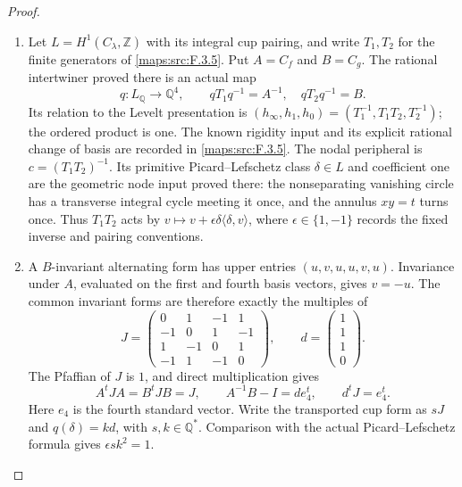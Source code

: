 \begin{proof}
\begin{enumerate}[label=\arabic*.]
\item Let $L=H^1(C_\lambda,\mathbb Z)$ with its integral cup pairing,
and write $T_1,T_2$ for the finite generators of
\cref{maps:src:F.3.5}. Put $A=C_f$ and $B=C_g$.
The rational intertwiner proved there is an actual map
\[
 q:L_{\mathbb Q}\longrightarrow\mathbb Q^4,
 \qquad qT_1q^{-1}=A^{-1},\quad qT_2q^{-1}=B.
\]
Its relation to the Levelt presentation is
$(h_\infty,h_1,h_0)=(T_1^{-1},T_1T_2,T_2^{-1})$;
the ordered product is one. The known rigidity input and its explicit
rational change of basis are recorded in \cref{maps:src:F.3.5}.
The nodal peripheral is $c=(T_1T_2)^{-1}$. Its primitive
Picard--Lefschetz class $\delta\in L$ and coefficient one are the
geometric node input proved there: the nonseparating vanishing circle
has a transverse integral cycle meeting it once, and the annulus
$xy=t$ turns once. Thus $T_1T_2$ acts by
$v\mapsto v+\epsilon\delta\langle\delta,v\rangle$,
where $\epsilon\in\{1,-1\}$ records the fixed inverse and pairing
conventions.

\item A $B$-invariant alternating form has upper entries
$(u,v,u,u,v,u)$. Invariance under $A$, evaluated on the first and
fourth basis vectors, gives $v=-u$. The common invariant forms are
therefore exactly the multiples of
\[
 J=\begin{pmatrix}
 0&1&-1&1\\-1&0&1&-1\\1&-1&0&1\\-1&1&-1&0
 \end{pmatrix},\qquad
 d=\begin{pmatrix}1\\1\\1\\0\end{pmatrix}.
\]
The Pfaffian of $J$ is $1$, and direct multiplication gives
\[
 A^tJA=B^tJB=J,\qquad
 A^{-1}B-I=d e_4^t,\qquad d^tJ=e_4^t.
\]
Here $e_4$ is the fourth standard vector. Write the transported cup
form as $sJ$ and $q(\delta)=k d$, with $s,k\in\mathbb Q^*$.
Comparison with the actual Picard--Lefschetz formula gives
$\epsilon s k^2=1$.


\end{enumerate}
\end{proof}
